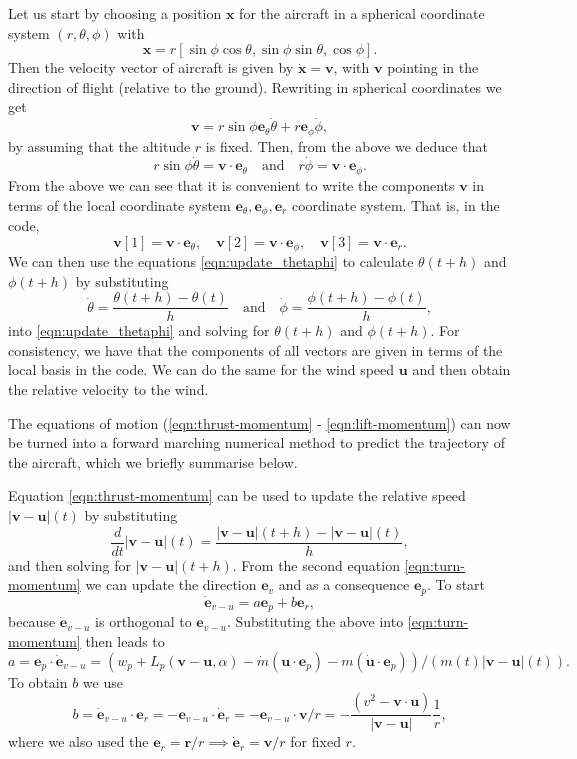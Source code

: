 \documentclass{article}
\renewcommand{\vec}[1]{\boldsymbol{#1}}
\begin{document}
Let us start by choosing a position $\vec x$ for the aircraft in a spherical coordinate system $(r,\theta,\phi)$ with
\[
\vec x = r [ \sin \phi \cos \theta, \sin \phi \sin \theta,   \cos \phi].
\]
Then the velocity vector of aircraft is given by $\dot{\vec x} = \vec v$, with $\vec v$ pointing in the direction of flight (relative to the ground). Rewriting in spherical coordinates we get
\[
\vec v = r \sin \phi  {\vec e_\theta} \dot \theta + r  {\vec e_\phi} \dot \phi, 
\]
by assuming that the altitude $r$ is fixed. Then, from the above we deduce that
\begin{equation} \label{eqn:update_thetaphi}
    r \sin \phi \dot \theta = \vec v \cdot {\vec e}_\theta  \quad \text{and} \quad 
r \dot \phi = \vec v \cdot {\vec e}_\phi.
\end{equation}
From the above we can see that it is convenient to write the components $\vec v$ in terms of the local coordinate system ${\vec e}_\theta, {\vec e}_\phi, {\vec e}_r$ coordinate system. That is, in the code, 
\[
\vec v[1] = \vec v \cdot {\vec e}_\theta, \quad 
\vec v[2] = \vec v \cdot {\vec e}_\phi, 
\quad 
\vec v[3] = \vec v \cdot {\vec e}_r.
\]
We can then use the equations \eqref{eqn:update_thetaphi}  to calculate $\theta(t+h)$ and $\phi(t+h)$ by substituting 
\[
\dot \theta = \frac{ \theta(t+h) - \theta(t)}{h} \quad \text{and} \quad 
\dot \phi = \frac{ \phi(t+h) - \phi(t)}{h},
\]
into \eqref{eqn:update_thetaphi} and solving for $\theta(t+h)$ and $\phi(t+h)$. For consistency, we have that the components of all vectors are given in terms of the local basis in the code. We can do the same for the wind speed $\vec u$ and then obtain the relative velocity to the wind.

The equations of motion (\ref{eqn:thrust-momentum} - \ref{eqn:lift-momentum}) can now be turned into a forward marching numerical method to predict the trajectory of the aircraft, which we briefly summarise below.

Equation \eqref{eqn:thrust-momentum} can be used to update the relative speed $|\vec{v}-\vec{u}|(t)$ by substituting
\[
\frac{d}{dt} { |\vec{v}-\vec{u}|}(t) = \frac{{|\vec{v}-\vec{u}|}(t+h) - |\vec{v}-\vec{u}|(t)}{h},
\]
and then solving for ${|\vec v- \vec u|}(t+h)$. From the second equation \eqref{eqn:turn-momentum} we can update the direction $\vec {e}_v$ and as a consequence $\vec e_p$. To start
\[
\dot{\vec e}_{v-u} = a {\vec e}_p + b {\vec e}_r, 
\]
because $\dot {\vec e}_{v-u}$ is orthogonal to ${\vec e}_{v-u}$. Substituting the above into \eqref{eqn:turn-momentum} then leads to
\begin{equation}
 a =  {\vec{e}}_p \cdot \dot{\vec{e}}_{v-u} =  (w_p + L_p(\vec{v}-\vec{u},\alpha)  - \dot m (\vec{u} \cdot \vec{e}_{p})- m(\dot{\vec{u}}\cdot \vec{e}_{p} ) )/ (m(t) |\vec v-\vec u|(t)).
\end{equation}
To obtain $b$ we use 
\begin{equation}
b = \dot{\vec e}_{v-u} \cdot  {\vec e}_r = - {\vec e}_{v-u} \cdot  \dot {\vec e}_r =  - {\vec e}_{v-u} \cdot  {\vec v} / r = - \frac{(v^2-\vec v \cdot \vec{u})}{|\vec v-\vec u| } \frac{1}{r},    
\end{equation}
where we also used the $\vec e_r = \vec r / r \implies \dot{\vec e}_r = \vec v / r$ for fixed $r$.
\end{document}
